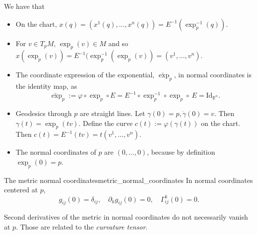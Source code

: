 \begin{colremark}
We have that 
\begin{itemize}[itemsep=0pt, topsep=0pt]
\item On the chart, $x(q)=(x^1(q),...,x^n(q))=E^{-1}(\exp_p^{-1}(q))$.
\item For $v\in T_pM$, $\exp_p(v)\in M$ and so  $x(\exp_p(v)) =E^{-1}(\exp_p^{-1}(\exp_p(v))=(v^1,...,v^n)$.
\item
The coordinate expression of the exponential, $\widetilde{\exp}_p$, in normal coordinates is the identity map, as 
$$\widetilde{\exp}_p
:= \varphi\circ\exp_p\circ E
= E^{-1}\circ\exp_p^{-1}\circ\exp_p\circ\ E
=\mathrm{Id}_{\mathbb{R}^n}.
$$
\item Geodesics through $p$ are straight lines. Let $\gamma(0)=p, \dot{\gamma}(0)=v$. Then $\gamma(t)=\exp_p(tv)$. Define the curve $c(t):=\varphi(\gamma(t))$ on the chart. Then $c(t)=E^{-1}(tv)=t(v^1,...,v^n)$.
\item The normal coordinates of $p$ are $(0, . . . , 0)$, because by definition $\exp_p(0)=p$.
\end{itemize}
\end{colremark}


\begin{colorlem}{The metric normal coordinates}{metric_normal_coordinates}
In normal coordinates centered at $p$,
\[
g_{ij}(0) = \delta_{ij}, \quad \partial_k g_{ij}(0) = 0, \quad \Gamma_{ij}^k(0) = 0.
\]
\end{colorlem}

Second derivatives of the metric in normal coordinates do not necessarily vanish at $p$. Those are related to the \emph{curvature tensor}.

